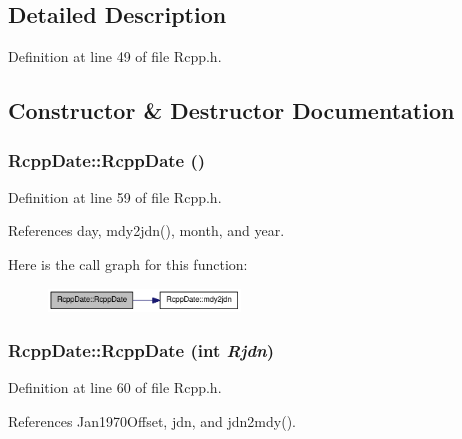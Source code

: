 \subsection{Detailed Description}


Definition at line 49 of file Rcpp.h.

\subsection{Constructor \& Destructor Documentation}
\hypertarget{classRcppDate_a4f0f6ae9e9e284fd058d615bcd78d6f9}{
\subsubsection[{RcppDate}]{\setlength{\rightskip}{0pt plus 5cm}RcppDate::RcppDate ()}}
\label{classRcppDate_a4f0f6ae9e9e284fd058d615bcd78d6f9}


Definition at line 59 of file Rcpp.h.

References day, mdy2jdn(), month, and year.

Here is the call graph for this function:\nopagebreak
\begin{figure}[H]
\begin{center}
\leavevmode
\includegraphics[width=145pt]{classRcppDate_a4f0f6ae9e9e284fd058d615bcd78d6f9_cgraph}
\end{center}
\end{figure}
\hypertarget{classRcppDate_a21adf306ddf84cf792f888d220bb9a3f}{
\subsubsection[{RcppDate}]{\setlength{\rightskip}{0pt plus 5cm}RcppDate::RcppDate (int {\em Rjdn})}}
\label{classRcppDate_a21adf306ddf84cf792f888d220bb9a3f}


Definition at line 60 of file Rcpp.h.

References Jan1970Offset, jdn, and jdn2mdy().

